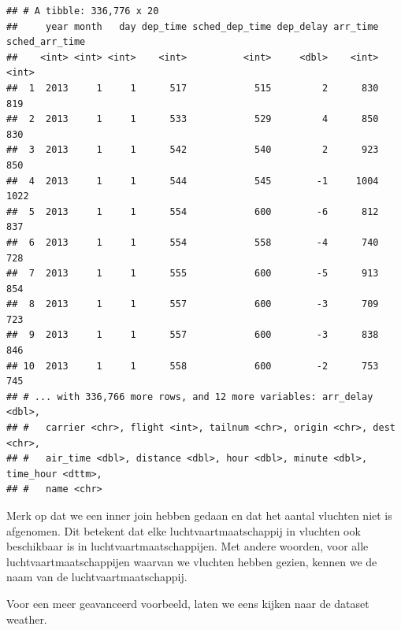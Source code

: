\documentclass[]{tufte-book}
\newenvironment{Shaded}{}{}
\newcommand{\KeywordTok}[1]{\textcolor[rgb]{0.00,0.44,0.13}{\textbf{#1}}}
\newcommand{\NormalTok}[1]{#1}
\newcommand{\OperatorTok}[1]{\textcolor[rgb]{0.40,0.40,0.40}{#1}}
\newcommand{\StringTok}[1]{\textcolor[rgb]{0.25,0.44,0.63}{#1}}
\begin{document}
\begin{Shaded}
\end{Shaded}

\begin{verbatim}
## # A tibble: 336,776 x 20
##     year month   day dep_time sched_dep_time dep_delay arr_time sched_arr_time
##    <int> <int> <int>    <int>          <int>     <dbl>    <int>          <int>
##  1  2013     1     1      517            515         2      830            819
##  2  2013     1     1      533            529         4      850            830
##  3  2013     1     1      542            540         2      923            850
##  4  2013     1     1      544            545        -1     1004           1022
##  5  2013     1     1      554            600        -6      812            837
##  6  2013     1     1      554            558        -4      740            728
##  7  2013     1     1      555            600        -5      913            854
##  8  2013     1     1      557            600        -3      709            723
##  9  2013     1     1      557            600        -3      838            846
## 10  2013     1     1      558            600        -2      753            745
## # ... with 336,766 more rows, and 12 more variables: arr_delay <dbl>,
## #   carrier <chr>, flight <int>, tailnum <chr>, origin <chr>, dest <chr>,
## #   air_time <dbl>, distance <dbl>, hour <dbl>, minute <dbl>, time_hour <dttm>,
## #   name <chr>
\end{verbatim}

Merk op dat we een inner join hebben gedaan en dat het aantal vluchten niet is afgenomen. Dit betekent dat elke luchtvaartmaatschappij in vluchten ook beschikbaar is in luchtvaartmaatschappijen. Met andere woorden, voor alle luchtvaartmaatschappijen waarvan we vluchten hebben gezien, kennen we de naam van de luchtvaartmaatschappij.

Voor een meer geavanceerd voorbeeld, laten we eens kijken naar de dataset weather.

\begin{Shaded}
\end{Shaded}
\end{document}

